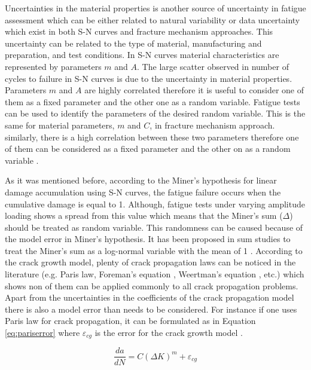Uncertainties in the material properties is another source of uncertainty in fatigue assessment which can be either related to natural variability or data uncertainty which exist in both S-N curves
and fracture mechanism approaches. This uncertainty can be related to the type of material, manufacturing and preparation, and test conditions.
In S-N curves material characteristics are represented by parameters $m$ and $A$. The large scatter observed in number of cycles to failure in S-N curves is 
due to the uncertainty in material properties. Parameters $m$ and $A$ are highly correlated therefore it is useful to consider one of them as a fixed parameter and the other one as a random variable. 
Fatigue tests can be used to identify the parameters of the desired random variable. This is the same for material parameters, $m$ and $C$, in fracture mechanism approach. similarly, there is a high 
correlation between these two parameters therefore one of them can be considered as a fixed parameter and the other on as a random variable \citep{Wirsching1984}. 

As it was mentioned before, according to the Miner's hypothesis for linear damage accumulation using S-N curves, the fatigue failure occurs when the cumulative damage is equal to 1. Although, 
fatigue tests under varying amplitude loading shows a spread from this value which means that the Miner's sum ($\Delta$) should be treated as random variable. This randomness can be caused 
because of the model error in Miner's hypothesis. It has been proposed in sum studies to treat the Miner's sum as a log-normal variable with the mean of 1 \citep{Wirsching1984}. According to the 
crack growth model, plenty of crack propagation laws can be noticed in the literature (e.g. Paris law, Foreman's equation \citep{MINGUEZ1994663}, Weertman's equation \citep{WEERTMAN1984563}, etc.)
which shows non of them can be applied 
commonly to all crack propagation problems. Apart from the uncertainties in the coefficients of the crack propagation model there is also a model error than needs to be considered. For instance 
if one uses Paris law for crack propagation, it can be formulated as in Equation \ref{eq:pariserror} where $\varepsilon_{cg}$ is the error for the crack growth model \citep{Sankararaman2009}. 

\begin{equation}
 \frac{da}{dN}= C(\Delta K)^m + \varepsilon_{cg}
 \label{eq:pariserror}
\end{equation}


